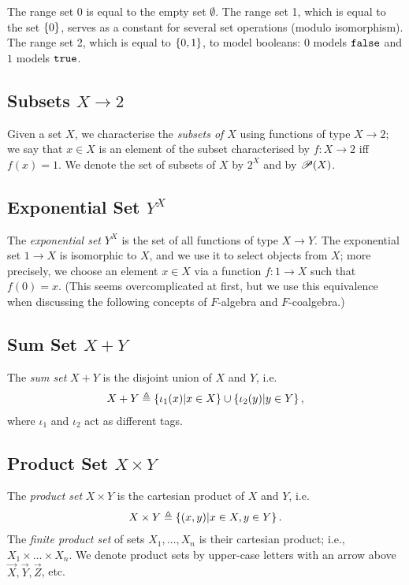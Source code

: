 The range set 0 is equal to the empty set $\emptyset$. 
The range set 1, which is equal to the set $\left\{0\right\}$, serves as a constant for several set operations (modulo isomorphism).
The range set 2, which is equal to $\left\{0,1\right\}$, to model booleans: 0 models $\mathtt{\texttt{false}}$ and $1$ models $\mathtt{\texttt{true}}$. 

\subsection{Subsets $X\rightarrow 2$}
Given a set $X$, we characterise the \emph{subsets of $X$} using functions of type $X\rightarrow 2$; we say that $x\in X$ is an element of the subset characterised by $f\colon X\rightarrow 2$ iff $f(x)=1$. We denote the set of subsets of $X$ by $2^X$ and by ${{\mathscr{P}}\!\left({X}\right)}$.
 
\subsection{Exponential Set $Y^X$}
The \emph{exponential set} $Y^X$ is the set of all functions of type $X\rightarrow Y$. 
The exponential set $1\rightarrow X$ is isomorphic to $X$, and we use it to select objects from $X$; more precisely, we choose an element $x\in X$ via a function $f\colon 1\rightarrow X$ such that $f(0)=x$. (This seems overcomplicated at first, but we use this equivalence when discussing the following concepts of $F$-algebra and $F$-coalgebra.)

\subsection{Sum Set $X+Y$}
The \emph{sum set} $X + Y$ is the disjoint union of $X$ and $Y$, i.e. 
\begin{align*}
    X + Y\triangleq\left\{ \iota_1(x) |x\in X\right\} \cup \left\{\iota_2(y) | y\in Y\right\},
\end{align*}
where $\iota_1$ and $\iota_2$ act as different tags.
\subsection{Product Set $X\times Y$}
The \emph{product set} $X\times Y$ is the cartesian product of $X$ and $Y$, i.e. 
\begin{align*}
    X\times Y\triangleq\left\{(x,y)|x\in X, y\in Y\right\}.
\end{align*}
The \emph{finite product set} of sets $X_1, \ldots, X_n$ is their cartesian product; i.e., $X_1\times \ldots \times X_n$. We denote product sets by upper-case letters with an arrow above $\vec{X},\vec{Y}, \vec{Z}$, etc.
